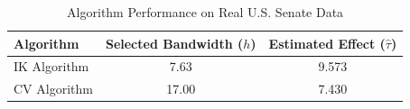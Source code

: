\begin{table}[h]
\centering
\caption{Algorithm Performance on Real U.S. Senate Data}
\begin{tabular}{lcc}
\hline
Algorithm & Selected Bandwidth ($h$) & Estimated Effect ($\hat{\tau}$) \\
\hline
IK Algorithm & 7.63 & 9.573 \\
CV Algorithm & 17.00 & 7.430 \\
\hline
\end{tabular}
\label{tab:real_data}\end{table}
